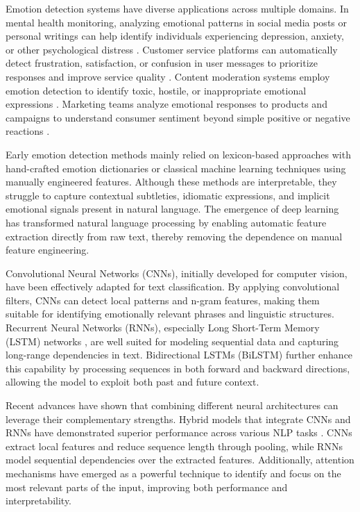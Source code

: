 \documentclass[12pt,a4paper]{article}
\begin{document}
Emotion detection systems have diverse applications across multiple domains. In mental health monitoring, analyzing emotional patterns in social media posts or personal writings can help identify individuals experiencing depression, anxiety, or other psychological distress \cite{zhang2021mental}. Customer service platforms can automatically detect frustration, satisfaction, or confusion in user messages to prioritize responses and improve service quality \cite{chen2021emotion}. Content moderation systems employ emotion detection to identify toxic, hostile, or inappropriate emotional expressions \cite{kumar2022toxic}. Marketing teams analyze emotional responses to products and campaigns to understand consumer sentiment beyond simple positive or negative reactions \cite{wang2022consumer}.

Early emotion detection methods mainly relied on lexicon-based approaches with hand-crafted emotion dictionaries or classical machine learning techniques using manually engineered features. Although these methods are interpretable, they struggle to capture contextual subtleties, idiomatic expressions, and implicit emotional signals present in natural language. The emergence of deep learning has transformed natural language processing by enabling automatic feature extraction directly from raw text, thereby removing the dependence on manual feature engineering.

Convolutional Neural Networks (CNNs), initially developed for computer vision, have been effectively adapted for text classification. By applying convolutional filters, CNNs can detect local patterns and n-gram features, making them suitable for identifying emotionally relevant phrases and linguistic structures. Recurrent Neural Networks (RNNs), especially Long Short-Term Memory (LSTM) networks \cite{minase2021deep}, are well suited for modeling sequential data and capturing long-range dependencies in text. Bidirectional LSTMs (BiLSTM) further enhance this capability by processing sequences in both forward and backward directions, allowing the model to exploit both past and future context.

Recent advances have shown that combining different neural architectures can leverage their complementary strengths. Hybrid models that integrate CNNs and RNNs have demonstrated superior performance across various NLP tasks \cite{li2022hybrid}. CNNs extract local features and reduce sequence length through pooling, while RNNs model sequential dependencies over the extracted features. Additionally, attention mechanisms \cite{vaswani2023attention} have emerged as a powerful technique to identify and focus on the most relevant parts of the input, improving both performance and interpretability.
\end{document}
